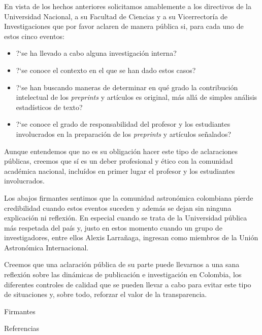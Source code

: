 \documentclass[11pt]{article}
\begin{document}
En vista de los hechos anteriores solicitamos amablemente a los
directivos de la Universidad Nacional, a su Facultad de Ciencias y a
su Vicerrector\'ia de Investigaciones que por favor aclaren de manera
p\'ublica si, para cada uno de estos cinco eventos:
\begin{itemize}
\item ?`se ha llevado a cabo alguna investigaci\'on interna?
\item ?`se conoce el contexto en el que se han dado estos casos?
\item ?`se han buscando maneras de determinar en qu\'e grado la contribuci\'on intelectual de los \textit{preprints} y art\'iculos es original, m\'as all\'a de simples an\'alisis estad\'isticos de texto?
\item ?`se conoce el grado de responsabilidad del profesor y los estudiantes involucrados en la preparaci\'on de los \textit{preprints} y art\'iculos se\~nalados?
\end{itemize}

Aunque entendemos que no es su obligaci\'on hacer este tipo de
aclaraciones p\'ublicas, creemos que s\'i es un deber profesional y \'etico
con la comunidad acad\'emica nacional, inclu\'idos en primer lugar el
profesor y los estudiantes involucrados.

Los abajos firmantes sentimos que la comunidad astron\'omica colombiana
pierde credibilidad cuando estos eventos suceden y adem\'as se dejan sin
ninguna explicaci\'on ni reflexi\'on. En especial cuando se trata de la Universidad
p\'ublica m\'as respetada del pa\'is y, justo en estos momento cuando un
grupo de investigadores, entre ellos Alexis Larra\~naga, ingresan como
miembros de la Uni\'on Astron\'omica Internacional.

Creemos que una aclaraci\'on p\'ublica de su parte puede
llevarnos a una sana reflexi\'on sobre las din\'amicas de publicaci\'on e
investigaci\'on en Colombia, los diferentes controles de calidad que se
pueden llevar a cabo para evitar este tipo de situaciones y, sobre
todo, reforzar el valor de la transparencia.


Firmantes

Referencias


\noindent
\end{document}
